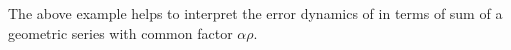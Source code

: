 The above example helps to interpret the error dynamics of  in terms of sum of a geometric series with common factor $\alpha\rho$.
\begin{comment}
\begin{example}
Consider deterministic problems $P^1$, $P^2$ and $P^3$ with $A_{P^1}=\begin{bmatrix} 10 &100\\ 0 &10\end{bmatrix}$, $A_{P^2}=\begin{bmatrix} 10 &9.99\\ 0 &10\end{bmatrix}$, $A_{P^3}=\begin{bmatrix} 10 &0 \\ 0 &10\end{bmatrix}$, $\sigma^2_{A_{P^i}}=\sigma_{b_{P^i}}=0,\,i=1,2,3$. Note that $P^1$, $P^2$ and $P^3$ are respectively H, PD, SPD respectively.
\end{example}

\end{comment}
